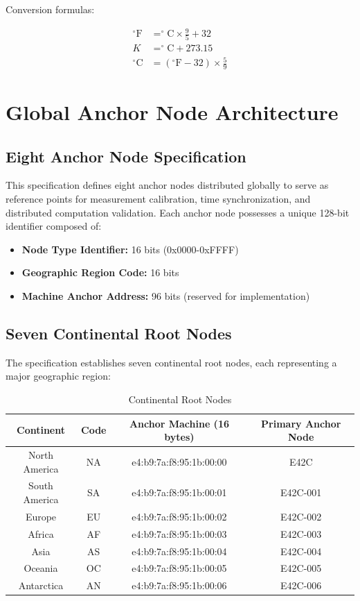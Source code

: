 \documentclass[12pt]{book}
\begin{document}
Conversion formulas:

\begin{align}
^{\circ}\text{F} &= ^{\circ}\text{C} \times \frac{9}{5} + 32 \\
K &= ^{\circ}\text{C} + 273.15 \\
^{\circ}\text{C} &= (^{\circ}\text{F} - 32) \times \frac{5}{9}
\end{align}

\chapter{Global Anchor Node Architecture}

\section{Eight Anchor Node Specification}

This specification defines eight anchor nodes distributed globally to serve as reference points for measurement calibration, time synchronization, and distributed computation validation. Each anchor node possesses a unique 128-bit identifier composed of:

\begin{itemize}
\item \textbf{Node Type Identifier:} 16 bits (0x0000-0xFFFF)
\item \textbf{Geographic Region Code:} 16 bits
\item \textbf{Machine Anchor Address:} 96 bits (reserved for implementation)
\end{itemize}

\section{Seven Continental Root Nodes}

The specification establishes seven continental root nodes, each representing a major geographic region:

\begin{table}[h]
\centering
\begin{tabular}{|c|c|c|c|}
\hline
Continent & Code & Anchor Machine (16 bytes) & Primary Anchor Node \\
\hline
North America & NA & e4:b9:7a:f8:95:1b:00:00 & E42C \\
\hline
South America & SA & e4:b9:7a:f8:95:1b:00:01 & E42C-001 \\
\hline
Europe & EU & e4:b9:7a:f8:95:1b:00:02 & E42C-002 \\
\hline
Africa & AF & e4:b9:7a:f8:95:1b:00:03 & E42C-003 \\
\hline
Asia & AS & e4:b9:7a:f8:95:1b:00:04 & E42C-004 \\
\hline
Oceania & OC & e4:b9:7a:f8:95:1b:00:05 & E42C-005 \\
\hline
Antarctica & AN & e4:b9:7a:f8:95:1b:00:06 & E42C-006 \\
\hline
\end{tabular}
\caption{Continental Root Nodes}
\end{table}
\end{document}
